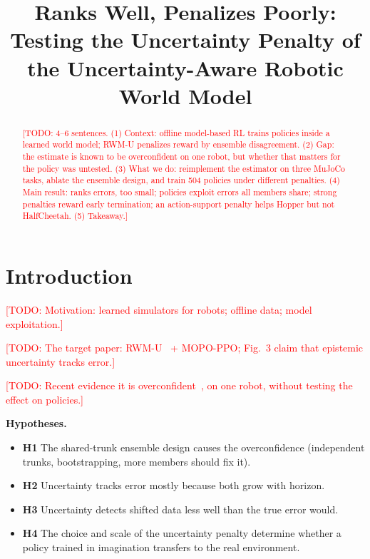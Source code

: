 \documentclass[conference]{IEEEtran}
\title{Ranks Well, Penalizes Poorly: Testing the Uncertainty Penalty
of the Uncertainty-Aware Robotic World Model}
\author{\IEEEauthorblockN{Natalia Espinosa-Dice}
\IEEEauthorblockA{COMP 765, McGill University\\
\texttt{\todo{email}}}}
\newcommand{\todo}[1]{\textcolor{red}{[TODO: #1]}}
\newcommand{\rwmu}{RWM-U}
\begin{document}
\maketitle

\begin{abstract}
\todo{4--6 sentences. (1) Context: offline model-based RL trains policies inside a learned world
model; \rwmu{} penalizes reward by ensemble disagreement. (2) Gap: the estimate is known to be
overconfident on one robot, but whether that matters for the policy was untested. (3) What we do:
reimplement the estimator on three MuJoCo tasks, ablate the ensemble design, and train 504
policies under different penalties. (4) Main result: ranks errors, too small; policies exploit
errors all members share; strong penalties reward early termination; an action-support penalty
helps Hopper but not HalfCheetah. (5) Takeaway.}
\end{abstract}

\section{Introduction}
\label{sec:intro}
\todo{Motivation: learned simulators for robots; offline data; model exploitation.}

\todo{The target paper: \rwmu{}~\cite{li2025rwmu} + MOPO-PPO; Fig.~3 claim that epistemic
uncertainty tracks error.}

\todo{Recent evidence it is overconfident~\cite{singh2026ranking,singh2026auditing}, on one robot,
without testing the effect on policies.}

\noindent\textbf{Hypotheses.}
\begin{itemize}
  \item \textbf{H1} The shared-trunk ensemble design causes the overconfidence (independent trunks,
        bootstrapping, more members should fix it).
  \item \textbf{H2} Uncertainty tracks error mostly because both grow with horizon.
  \item \textbf{H3} Uncertainty detects shifted data less well than the true error would.
  \item \textbf{H4} The choice and scale of the uncertainty penalty determine whether a policy
        trained in imagination transfers to the real environment.
\end{itemize}
\end{document}
